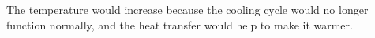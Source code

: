 The temperature would increase because the cooling cycle would no longer function normally, and the heat transfer would help to make it warmer.
